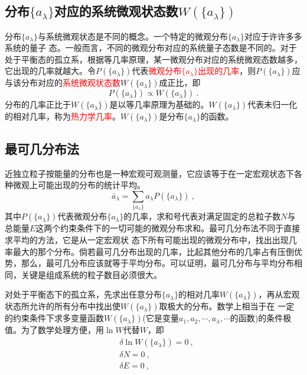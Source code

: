 \documentclass[12pt,a4paper]{article}
\begin{document}
\subsection{分布$\{a_\lambda \}$对应的系统微观状态数$W(\{a_\lambda \})$}
分布$\{a_\lambda \}$与系统微观状态是不同的概念。一个特定的微观分布$\{a_\lambda \}$对应于许许多多系统的量子 态。一般而言，不同的微观分布对应的系统量子态数是不同的。对于处于平衡态的孤立系，根据等几率原理，某一微观分布对应的系统微观态数越多，它出现的几率就越大。令$P(\{a_\lambda \})$代表\textcolor{red}{微观分布$\{a_\lambda \}$出现的几率}，则$P(\{a_\lambda \})$应与该分布对应的\textcolor{red}{系统微观状态数}$W(\{a_\lambda \})$成正比，即
\begin{equation}
P(\{a_\lambda \}) \propto W(\{a_\lambda \}) ~.
\end{equation}
分布的几率正比于$W(\{a_\lambda\})$是以等几率原理为基础的。$W(\{a_\lambda\})$代表未归一化的相对几率，称为\textcolor{red}{热力学几率}。$W(\{a_\lambda\})$是分布$\{a_\lambda \}$的函数。

\subsection{最可几分布法}
近独立粒子按能量的分布也是一种宏观可观测量，它应该等于在一定宏观状态下各种微观上可能出现的分布的统计平均。
\begin{equation}
\bar{a}_\lambda = \sum_{\{a_\lambda \}} a_\lambda P(\{a_\lambda \}) ~,
\end{equation}
其中$P(\{a_\lambda \})$代表微观分布$\{a_\lambda \}$的几率，求和号代表对满足固定的总粒子数$N$与总能量$E$这两个约束条件下的一切可能的微观分布求和。最可几分布法不同于直接求平均的方法，它是从一定宏观状 态下所有可能出现的微观分布中，找出出现几率最大的那个分布。倘若最可几分布出现的几率，比起其他分布的几率占有压倒优势，那么，最可几分布应该就等于平均分布。可以证明，最可几分布与平均分布相同，关键是组成系统的粒子数目必须很大。

对处于平衡态下的孤立系，先求出任意分布$\{a_\lambda \}$的相对几率$W(\{a_\lambda \})$，再从宏观状态所允许的所有分布中找出使$W(\{a_\lambda \})$取极大的分布。数学上相当于在 一定的约束条件下求多变量函数$W(\{a_\lambda \})$(它是变量$a_1,  a_2, \cdots,  a_\lambda, \cdots$的函数)的条件极值。为了数学处理方便，用$\ln W$代替$W$，即
\begin{align}
& \delta \ln W (\{a_\lambda \}) = 0 ~, \\
& \delta N = 0 ~, \\
& \delta E = 0 ~,
\end{align}
\end{document}
